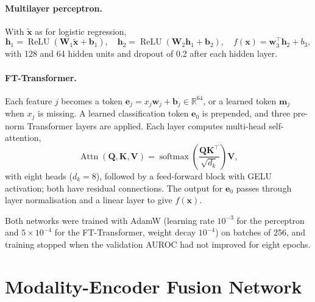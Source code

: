 \paragraph{Multilayer perceptron.} With $\tilde{\mathbf{x}}$ as for logistic regression,
\begin{equation}
\mathbf{h}_1 = \operatorname{ReLU}(\mathbf{W}_1 \tilde{\mathbf{x}} + \mathbf{b}_1), \quad
\mathbf{h}_2 = \operatorname{ReLU}(\mathbf{W}_2 \mathbf{h}_1 + \mathbf{b}_2), \quad
f(\mathbf{x}) = \mathbf{w}_3^{\top} \mathbf{h}_2 + b_3,
\end{equation}
with 128 and 64 hidden units and dropout of 0.2 after each hidden layer.

\paragraph{FT-Transformer.} Each feature $j$ becomes a token $\mathbf{e}_j = x_j \mathbf{w}_j + \mathbf{b}_j \in \mathbb{R}^{64}$, or a learned token $\mathbf{m}_j$ when $x_j$ is missing. A learned classification token $\mathbf{e}_0$ is prepended, and three pre-norm Transformer layers are applied. Each layer computes multi-head self-attention,
\begin{equation}
\operatorname{Attn}(\mathbf{Q}, \mathbf{K}, \mathbf{V}) = \operatorname{softmax}\!\left( \frac{\mathbf{Q}\mathbf{K}^{\top}}{\sqrt{d_k}} \right) \mathbf{V},
\end{equation}
with eight heads ($d_k = 8$), followed by a feed-forward block with GELU activation; both have residual connections. The output for $\mathbf{e}_0$ passes through layer normalisation and a linear layer to give $f(\mathbf{x})$.

Both networks were trained with AdamW (learning rate $10^{-3}$ for the perceptron and $5 \times 10^{-4}$ for the FT-Transformer, weight decay $10^{-4}$) on batches of 256, and training stopped when the validation AUROC had not improved for eight epochs.

\section{Modality-Encoder Fusion Network}
\label{sec:fusion_net}

